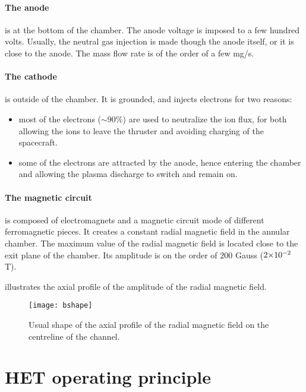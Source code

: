   \paragraph{The anode} is at the bottom of the chamber.
  The anode voltage is imposed to a few hundred volts.
  Usually, the neutral gas injection is made though the anode itself, or it is close to the anode.
  The mass flow rate is of the order of a few mg/s.

  \paragraph{The cathode} is outside of the chamber.
  It is grounded, and injects electrons for two reasons\string:
  \begin{itemize}
    \item most of the electrons ($\sim 90 \%$) are used to neutralize the ion flux, for both allowing the ions to leave the thruster and avoiding charging of the spacecraft.
    \item some of the electrons are attracted by the anode, hence entering the chamber and allowing the plasma discharge to switch and remain on.
  \end{itemize}

  \paragraph{The magnetic circuit} is composed of electromagnets and a magnetic circuit mode of different ferromagnetic pieces.
  It creates a constant radial magnetic field in the annular chamber.
  The maximum value of the radial magnetic field is located close to the exit plane of the chamber.
  Its amplitude is on the order of $200$ Gauss (${{2}{\times}10^{-2}}$ T).

   illustrates the axial profile of the amplitude of the radial magnetic field.
  \begin{figure}[hbtp]
    \centering
    \texttt{[image: bshape]}
    \caption{Usual shape of the axial profile of the radial magnetic field on the centreline of the channel.}
    \label{fig-bshape}
  \end{figure}


\section*{HET operating principle}


